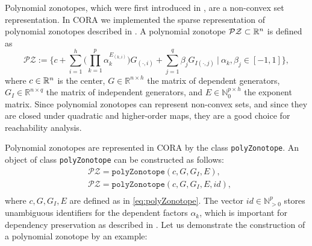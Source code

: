  \label{sec:polynomialZonotopes}

Polynomial zonotopes, which were first introduced in \cite{Althoff2013a}, are a non-convex set representation. In CORA we implemented the sparse representation of polynomial zonotopes described in \cite{Kochdumper2021a}. A polynomial zonotope $\mathcal{PZ} \subset \mathbb{R}^n$ is defined as
\begin{equation}
    \mathcal{PZ} := \bigg\{ c + \sum _{i=1}^h \bigg( \prod _{k=1}^p \alpha _k ^{E_{(k,i)}} \bigg) G_{(\cdot,i)} + \sum _{j=1}^{q} \beta _j G_{I(\cdot,j)} ~ \bigg| ~ \alpha_k, \beta_j \in [-1,1] \bigg\},
  \label{eq:polyZonotope}
\end{equation}
where $c \in \mathbb{R}^n$ is the center, $G \in \mathbb{R}^{n \times h}$ the matrix of dependent generators, $G_I \in \mathbb{R}^{n \times q}$ the matrix of independent generators, and  $E \in \mathbb{N}_{0}^{p \times h}$ the exponent matrix. Since polynomial zonotopes can represent non-convex sets, and since they are closed under quadratic and higher-order maps, they are a good choice for reachability analysis.

Polynomial zonotopes are represented in CORA by the class \texttt{polyZonotope}. An object of class \texttt{polyZonotope} can be constructed as follows:
\begin{equation*}
	\begin{split}
	& \mathcal{PZ} = \texttt{polyZonotope}(c,G,G_I,E), \\
	& \mathcal{PZ} = \texttt{polyZonotope}(c,G,G_I,E,id), \\
	\end{split}
\end{equation*} 
where $c,G,G_I,E$ are defined as in \eqref{eq:polyZonotope}. The vector $id \in \mathbb{N}^p_{> 0}$ stores unambiguous identifiers for the dependent factors $\alpha_k$, which is important for dependency preservation as described in \cite{Kochdumper2020c}. Let us demonstrate the construction of a polynomial zonotope by an example:

\begin{center}
\begin{minipage}[t]{0.55\textwidth}
	\vspace{10pt}
	\footnotesize
	
\end{minipage}
\begin{minipage}[t]{0.3\textwidth}
	\vspace{0pt}
	\centering
\end{minipage}
\end{center}

